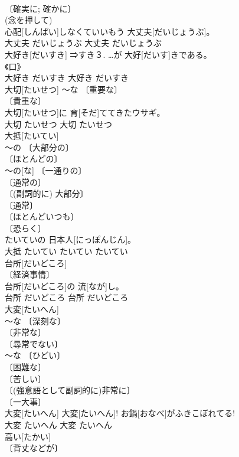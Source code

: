 \documentclass[8pt]{extreport}
\begin{document}
\begin{CJK}{UTF8}{min}
\\	〔確実に; 確かに〕 
\\	(念を押して) 
\\	心配[しんぱい]しなくていいもう 大丈夫[だいじょうぶ]。	
\\	大丈夫	だいじょうぶ	大丈夫	だいじょうぶ	
\\	大好き[だいすき]	⇒すき３.	…が 大好[だいす]きである。	
\\	《口》 
\\	大好き	だいすき	大好き	だいすき	
\\	大切[たいせつ]	～な 〔重要な〕 
\\	〔貴重な〕 
\\	[⇒だいじ３]	大切[たいせつ]に 育[そだ]ててきたウサギ。	
\\	大切	たいせつ	大切	たいせつ	
\\	大抵[たいてい]	
\\	～の 〔大部分の〕 
\\	〔ほとんどの〕 
\\	～の[な] 〔一通りの〕 
\\	〔通常の〕 
\\	〔(副詞的に) 大部分〕 
\\	〔通常〕 
\\	〔ほとんどいつも〕 
\\	〔恐らく〕 
\\	たいていの 日本人[にっぽんじん]。	
\\	大抵	たいてい	たいてい	たいてい	
\\	台所[だいどころ]	
\\	〔経済事情〕 
\\	台所[だいどころ]の 流[なが]し。	
\\	台所	だいどころ	台所	だいどころ	
\\	大変[たいへん]	
\\	～な 〔深刻な〕 
\\	〔非常な〕 
\\	〔尋常でない〕 
\\	～な 〔ひどい〕 
\\	〔困難な〕 
\\	〔苦しい〕 
\\	〔(強意語として副詞的に)非常に〕 
\\	〔一大事〕 
\\	大変[たいへん] 大変[たいへん]! お鍋[おなべ]がふきこぼれてる!	
\\	大変	たいへん	大変	たいへん	
\\	高い[たかい]	
\\	〔背丈などが〕 

\end{CJK}
\end{document}
